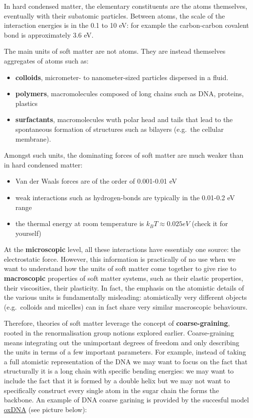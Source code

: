 \documentclass[
  letterpaper,
  enabledeprecatedfontcommands]{report}
\providecommand{\tightlist}{%
  \setlength{\itemsep}{0pt}\setlength{\parskip}{0pt}}
\begin{document}
In hard condensed matter, the elementary constituents are the atoms
themselves, eventually with their subatomic particles. Between atoms,
the scale of the interaction energies is in the 0.1 to 10 eV: for
example the carbon-carbon covalent bond is approximately 3.6 eV.

The main units of soft matter are not atoms. They are instead themselves
aggregates of atoms such as:

\begin{itemize}
\tightlist
\item
  \textbf{colloids}, micrometer- to nanometer-sized particles dispersed
  in a fluid.
\item
  \textbf{polymers}, macromolecules composed of long chains such as DNA,
  proteins, plastics
\item
  \textbf{surfactants}, macromolecules wuth polar head and tails that
  lead to the spontaneous formation of structures such as bilayers
  (e.g.~the cellular membrane).
\end{itemize}

Amongst such units, the dominating forces of soft matter are much weaker
than in hard condensed matter:

\begin{itemize}
\tightlist
\item
  Van der Waals forces are of the order of 0.001-0.01 eV
\item
  weak interactions such as hydrogen-bonds are typically in the 0.01-0.2
  eV range
\item
  the thermal energy at room temperature is \(k_B T \approx 0.025 eV\)
  (check it for yourself)
\end{itemize}

At the \textbf{microscopic} level, all these interactions have
essentialy one source: the electrostatic force. However, this
information is practically of no use when we want to understand how the
units of soft matter come together to give rise to \textbf{macroscopic}
properties of soft matter systems, such as their elastic properties,
their viscosities, their plasticity. In fact, the emphasis on the
atomistic details of the various units is fundamentally misleading:
atomistically very different objects (e.g.~colloids and micelles) can in
fact share very similar macroscopic behaviours.

Therefore, theories of soft matter leverage the concept of
\textbf{coarse-graining}, rooted in the renormalisation group notions
explored earlier. Coarse-graining means integrating out the unimportant
degrees of freedom and only describing the units in terms of a few
important parameters. For example, instead of taking a full atomistic
representation of the DNA we may want to focus on the fact that
structurally it is a long chain with specific bending energies: we may
want to include the fact that it is formed by a double helix but we may
not want to specifically construct every single atom in the sugar chain
the forms the backbone. An example of DNA coarse garining is provided by
the succesful model
\href{https://dna.physics.ox.ac.uk/index.php/Main_Page}{oxDNA} (see
picture below):
\end{document}
